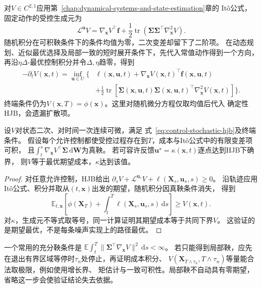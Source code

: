 对$V\in C^{2,1}$应用第~\ref{chap:dynamical-systems-and-state-estimation}章的
Itô公式，固定动作的受控生成元为
\[
  \mathcal L^{\bm u}V=
  \nabla_{\bm x}V^\top\bm f+
  \frac12\operatorname{tr}
    (\bm\Sigma\bm\Sigma^\top\nabla_{\bm x}^2V).
\]
随机积分在可积鞅条件下的条件均值为零，二次变差却留下了二阶项。
在动态规划、近似最优选择及局部一致的短时展开条件下，先代入常值动作得到一个方向，
再沿$\eta\Delta$-最优控制积分并令$\Delta,\eta$趋零，得到
\begin{equation}
  \begin{aligned}
  -\partial_tV(\bm x,t)=\inf_{\bm u\in U}\biggl\{&
    \ell(\bm x,\bm u,t)+
    \nabla_{\bm x}V(\bm x,t)^\top\bm f(\bm x,\bm u,t)\\
    &+\frac12\operatorname{tr}\!\left[
      \bm\Sigma(\bm x,\bm u,t)\bm\Sigma(\bm x,\bm u,t)^\top
      \nabla_{\bm x}^2V(\bm x,t)\right]\biggr\}.
  \end{aligned}
  \label{eq:control-stochastic-hjb}
\end{equation}
终端条件仍为$V(\bm x,T)=\phi(\bm x)$。这里对随机微分方程仅取均值后代入
确定性HJB，会遗漏扩散项。

\begin{theorem}[随机HJB验证]
\label{thm:control-stochastic-hjb-verification}
设$V$对状态二次、对时间一次连续可微，满足
式~\eqref{eq:control-stochastic-hjb}及终端条件。
假设每个允许控制都使受控过程存在到$T$，成本与Itô公式中的有限变差项可积，
且$\int_t^s\nabla_{\bm x}V^\top\bm\Sigma\,\mathrm d\bm W$为真鞅。
若可容许反馈$\bm u^\star=\kappa(\bm x,t)$逐点达到HJB下确界，
则$V$等于最优期望成本，$\kappa$达到该值。
\end{theorem}
\begin{proof}
对任意允许控制，HJB给出
$\partial_sV+\mathcal L^{\bm u_s}V+\ell(\bm X_s,\bm u_s,s)\geq0$。
沿轨迹应用Itô公式、积分并取从$(t,\bm x)$出发的期望，随机积分因真鞅条件消失，
得到
\[
  \mathbb E_{t,\bm x}\left[
    \phi(\bm X_T)+\int_t^T\ell(\bm X_s,\bm u_s,s)\,\mathrm ds\right]
  \geq V(\bm x,t).
\]
对$\kappa$，生成元不等式取等号，同一计算证明其期望成本等于共同下界$V$。
这验证的是期望最优，不是每条噪声实现上的路径最优。
\end{proof}

一个常用的充分鞅条件是
$\mathbb E\int_t^T\lVert\bm\Sigma^\top\nabla_{\bm x}V\rVert^2\,\mathrm ds<\infty$。
若只能得到局部鞅，应先在退出有界区域等停时$\tau_n$处停止，再证明成本积分、
$V(\bm X_{T\wedge\tau_n},T\wedge\tau_n)$等量能合法取极限，例如使用增长界、
矩估计与一致可积性。局部鞅不自动具有零期望，省略这一步会使验证结论失去依据。

